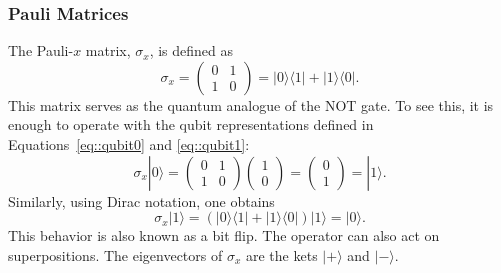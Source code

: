 \documentclass[a4paper]{article}
\begin{document}
\subsubsection{Pauli Matrices}\label{sec::PauliMatrix}
The Pauli-$x$ matrix, $\sigma_x$, is defined as
\begin{equation}
\sigma_x=\begin{pmatrix}
		0 &1 \\
		1 &0
	\end{pmatrix}=|0\rangle\langle 1|+|1\rangle\langle 0|.
\end{equation}
This matrix serves as the quantum analogue of the NOT gate. To see this, it is enough to operate with the qubit representations defined in Equations~\ref{eq::qubit0} and \ref{eq::qubit1}:
\begin{equation}
\sigma_x|0\rangle=
	\begin{pmatrix}
		0 &1 \\
		1 &0
	\end{pmatrix}
	\begin{pmatrix}
		1 \\
		0
	\end{pmatrix}=
	\begin{pmatrix}
		0 \\
		1
	\end{pmatrix}=|1\rangle.
\end{equation}
Similarly, using Dirac notation, one obtains
\begin{equation}
\sigma_x|1\rangle=(|0\rangle\langle 1|+|1\rangle\langle 0|)|1\rangle=|0\rangle.
\end{equation}
This behavior is also known as a bit flip. The operator can also act on superpositions. The eigenvectors of $\sigma_x$ are the kets $|+\rangle$ and $|-\rangle$.\\
\end{document}
